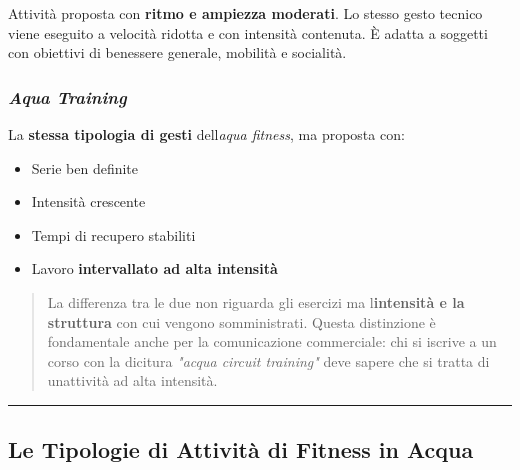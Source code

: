 \documentclass[a4paper,11pt]{article}
\providecommand{\tightlist}{%
  \setlength{\itemsep}{0pt}\setlength{\parskip}{0pt}}
\begin{document}
Attività proposta con \textbf{ritmo e ampiezza moderati}. Lo stesso
gesto tecnico viene eseguito a velocità ridotta e con intensità
contenuta. È adatta a soggetti con obiettivi di benessere generale,
mobilità e socialità.

\subsubsection{\texorpdfstring{\emph{Aqua
                  Training}}{Aqua Training}}\label{aqua-training}

La \textbf{stessa tipologia di gesti} dell\textquotesingle{}\emph{aqua
      fitness}, ma proposta con:

\begin{itemize}
      \tightlist
      \item
            Serie ben definite
      \item
            Intensità crescente
      \item
            Tempi di recupero stabiliti
      \item
            Lavoro \textbf{intervallato ad alta intensità}
\end{itemize}

\begin{quote}
      La differenza tra le due non riguarda gli esercizi ma
      l\textquotesingle{}\textbf{intensità e la struttura} con cui vengono
      somministrati. Questa distinzione è fondamentale anche per la
      comunicazione commerciale: chi si iscrive a un corso con la dicitura
      \emph{"acqua circuit training"} deve sapere che si tratta di
      un\textquotesingle attività ad alta intensità.
\end{quote}

\begin{center}\rule{0.5\linewidth}{0.5pt}\end{center}

\subsection{Le Tipologie di Attività di Fitness in
      Acqua}\label{le-tipologie-di-attivituxe0-di-fitness-in-acqua}
\end{document}
